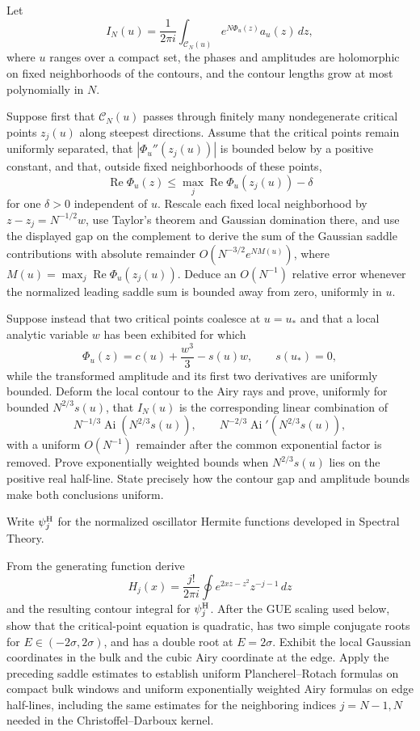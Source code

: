 \begin{exercise}
Let
\[
I_N(u)=\frac1{2\pi i}\int_{\mathcal C_N(u)}
e^{N\Phi_u(z)}a_u(z)\,dz,
\]
where $u$ ranges over a compact set, the phases and amplitudes are
holomorphic on fixed neighborhoods of the contours, and the contour
lengths grow at most polynomially in $N$.

Suppose first that $\mathcal C_N(u)$ passes through finitely many
nondegenerate critical points $z_j(u)$ along steepest directions.  Assume
that the critical points remain uniformly separated, that
$|\Phi_u''(z_j(u))|$ is bounded below by a positive constant, and that,
outside fixed neighborhoods of these points,
\[
\operatorname{Re}\Phi_u(z)
\leq\max_j\operatorname{Re}\Phi_u(z_j(u))-\delta
\]
for one $\delta>0$ independent of $u$.  Rescale each fixed local
neighborhood by $z-z_j=N^{-1/2}w$, use Taylor's theorem and Gaussian
domination there, and use the displayed gap on the complement to derive
the sum of the Gaussian saddle contributions with absolute remainder
$O(N^{-3/2}e^{NM(u)})$, where
$M(u)=\max_j\operatorname{Re}\Phi_u(z_j(u))$.  Deduce an $O(N^{-1})$
relative error whenever the normalized leading saddle sum is bounded away
from zero, uniformly in $u$.

Suppose instead that two critical points coalesce at $u=u_*$ and that a
local analytic variable $w$ has been exhibited for which
\[
\Phi_u(z)=c(u)+\frac{w^3}{3}-s(u)w,
\qquad s(u_*)=0,
\]
while the transformed amplitude and its first two derivatives are
uniformly bounded.  Deform the local contour to the Airy rays and prove,
uniformly
for bounded $N^{2/3}s(u)$, that $I_N(u)$ is the corresponding linear
combination of
\[
N^{-1/3}\operatorname{Ai}\!\left(N^{2/3}s(u)\right),
\qquad
N^{-2/3}\operatorname{Ai}'\!\left(N^{2/3}s(u)\right),
\]
with a uniform $O(N^{-1})$ remainder after the common exponential factor
is removed.  Prove exponentially weighted bounds when
$N^{2/3}s(u)$ lies on the positive real half-line.  State precisely how
the contour gap and amplitude bounds make both conclusions uniform.
\end{exercise}

\begin{exercise}
Write $\psi_j^{\rm H}$ for the normalized oscillator Hermite functions
developed in Spectral Theory.

From the generating function derive
\[
H_j(x)=\frac{j!}{2\pi i}\oint
e^{2xz-z^2}z^{-j-1}\,dz
\]
and the resulting contour integral for $\psi_j^{\rm H}$.  After the GUE
scaling used below, show that the critical-point equation is quadratic,
has two simple conjugate roots for $E\in(-2\sigma,2\sigma)$, and has a
double root at $E=2\sigma$.  Exhibit the local Gaussian coordinates in the
bulk and the cubic Airy coordinate at the edge.  Apply the preceding
saddle estimates to establish uniform Plancherel--Rotach formulas on
compact bulk windows and uniform exponentially weighted Airy formulas on
edge half-lines, including the same estimates for the neighboring indices
$j=N-1,N$ needed in the Christoffel--Darboux kernel.
\end{exercise}

